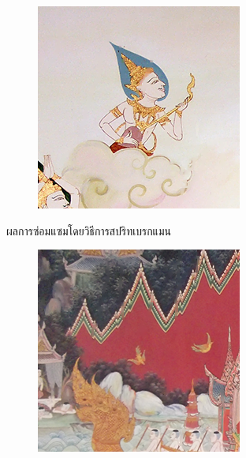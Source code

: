\documentclass[xcolor=dvipsnames, xetex,serif]{beamer}
\numberwithin{equation}{section}
\begin{document}
\begin{frame}
\begin{figure}[H]
\begin{subfigure}{0.15\linewidth}
            \end{subfigure}
            \begin{subfigure}{0.15\linewidth}
                \centering
                \includegraphics[width=0.9\linewidth]{images/result_ex4/splitbergman_case05.png}			
            \end{subfigure}
            \caption{ผลการซ่อมแซมโดยวิธีการสปริทเบรกแมน}
        \end{figure}
        \begin{figure}[H]
            \centering
            \begin{subfigure}{0.15\linewidth}
                \centering
                \includegraphics[width=0.9\linewidth]{images/result_ex4/multisplitbergman_case01.png}

\end{subfigure}
\end{figure}
\end{frame}
\end{document}
